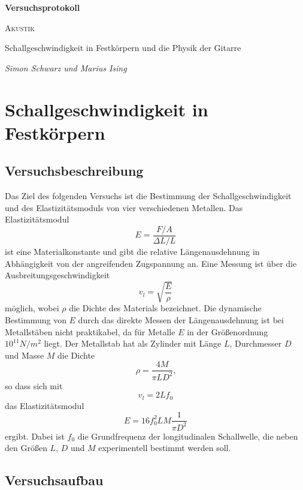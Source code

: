 \documentclass[a4paper, 12pt]{scrartcl}
\begin{document}
\begin{titlepage}
	\centering
	{\Huge\bfseries Versuchsprotokoll\par}
	\vspace{2cm}
	{\scshape\LARGE Akustik \par}
	\vspace{1cm}
	{\Large Schallgeschwindigkeit in Festkörpern und die Physik der Gitarre\par}
	\vfill
	{\large\itshape Simon Schwarz und Marius Ising\par}

	\vfill
\end{titlepage}

\tableofcontents

\section{Schallgeschwindigkeit in Festkörpern}


\subsection{Versuchsbeschreibung}

Das Ziel des folgenden Versuchs ist die Bestimmung der Schallgeschwindigkeit und des Elastizitätsmoduls von vier verschiedenen Metallen. Das Elastizitätsmodul 
$$E = \frac{F/A}{\Delta L/L}$$
ist eine Materialkonstante und gibt die relative Längenausdehnung in Abhängigkeit von der angreifenden Zugspannung an. Eine Messung ist über die Ausbreitungsgeschwindigkeit 
$$v_l = \sqrt{\frac{E}{\rho}}$$
möglich, wobei $\rho$ die Dichte des Materials bezeichnet. Die dynamische Bestimmung von $E$ durch das direkte Messen der Längenausdehnung ist bei Metallstäben nicht praktikabel, da für Metalle $E$ in der Größenordnung $10^{11} N/m^2$ liegt. Der Metallstab hat als Zylinder mit Länge $L$, Durchmesser $D$ und Masse $M$ die Dichte
\begin{equation}\label{eq:rho}
\rho = \frac{4M}{\pi LD^2}\text{,}
\end{equation}
so dass sich mit
$$v_l = 2L f_0$$
das Elastizitätsmodul
$$E = 16 f_0^2 LM \frac{1}{\pi D^2}$$
ergibt. Dabei ist $f_0$ die Grundfrequenz der longitudinalen Schallwelle, die neben den Größen $L$, $D$ und $M$ experimentell bestimmt werden soll.

\subsection{Versuchsaufbau}
\end{document}
